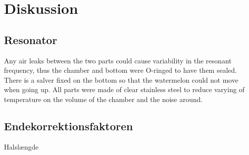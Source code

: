 \chapter{Diskussion}

\section{Resonator}
Any air leaks between the two parts could cause variability in
the resonant frequency, thus the chamber and bottom were O-ringed to have them sealed. There is a salver
fixed on the bottom so that the watermelon could not move when going up. All parts were made of clear
stainless steel to reduce varying of temperature on the volume of the chamber and the noise around.

\section{Endekorrektionsfaktoren}

Halslængde